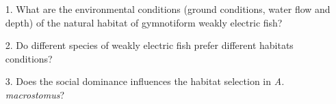 \begin{itemize}
\item[1.] What are the environmental conditions (ground conditions, water flow and depth) of the natural habitat of gymnotiform weakly electric fish?

\item[2.] Do different species of weakly electric fish prefer different habitats conditions?

\item[3.] Does the social dominance influences the  habitat selection in \textit{A. macrostomus}?
\end{itemize}{}
